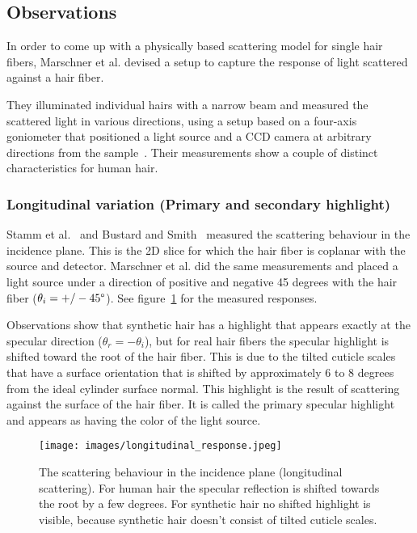 \documentclass[11pt,a4paper]{report}
\begin{document}
\subsection{Observations}
%
%
 
In order to come up with a physically based scattering model for single hair fibers, Marschner et al. devised a setup to capture the response of light scattered against a hair fiber. 

They illuminated individual hairs with a narrow beam and measured the scattered light in various directions, using a setup based on a four-axis goniometer that positioned a light source and a CCD camera at arbitrary directions from the sample~\cite{marschner}. Their measurements show a couple of distinct characteristics for human hair.

\subsubsection{Longitudinal variation (Primary and secondary highlight)}
\label{sec_longitudinal_observation}

Stamm et al.~\cite{stamm1977} and Bustard and Smith~\cite{bustard1991} measured the scattering behaviour in the incidence plane. This is the 2D slice for which the hair fiber is coplanar with the source and detector. Marschner et al. did the same measurements and placed a light source under a direction of positive and negative 45 degrees with the hair fiber ($\theta_i = +/- 45\degree$). See figure~\ref{fig_longitudinal_marschner} for the measured responses.

Observations show that synthetic hair has a highlight that appears exactly at the specular direction ($\theta_r = -\theta_i$), but for real hair fibers the specular highlight is shifted toward the root of the hair fiber. This is due to the tilted cuticle scales that have a surface orientation that is shifted by approximately 6 to 8 degrees from the ideal cylinder surface normal. This highlight is the result of scattering against the surface of the hair fiber. It is called the primary specular highlight and appears as having the color of the light source.

\begin{figure}[h]
\begin{center}
\texttt{[image: images/longitudinal\_response.jpeg]}
\caption{The scattering behaviour in the incidence plane (longitudinal scattering). For human hair the specular reflection is shifted towards the root by a few degrees. For synthetic hair no shifted highlight is visible, because synthetic hair doesn't consist of tilted cuticle scales.}
\label{fig_longitudinal_marschner}
\end{center}
\end{figure}
\end{document}
